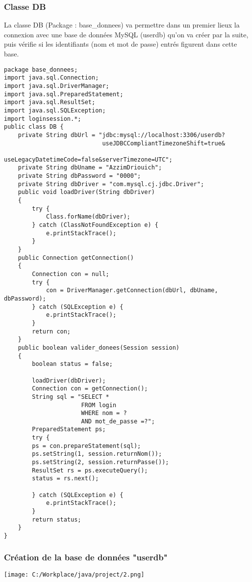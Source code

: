 \documentclass[12]{article}
\begin{document}
\newpage
\subsubsection{Classe DB}

La classe DB (Package : base\_donnees) va permettre dans un premier lieux la connexion avec une base de données MySQL (userdb) qu'on va créer par la suite, puis vérifie si les identifiants (nom et mot de passe) entrés figurent dans cette base.\\
\lstset{language=java}
\begin{lstlisting}
package base_donnees;
import java.sql.Connection;
import java.sql.DriverManager;
import java.sql.PreparedStatement;
import java.sql.ResultSet;
import java.sql.SQLException;
import loginsession.*;
public class DB {
	private String dbUrl = "jdbc:mysql://localhost:3306/userdb?
                            useJDBCCompliantTimezoneShift=true&
                            useLegacyDatetimeCode=false&serverTimezone=UTC";
	private String dbUname = "AzzimDriouich";
	private String dbPassword = "0000";
	private String dbDriver = "com.mysql.cj.jdbc.Driver";
	public void loadDriver(String dbDriver)
	{
		try {
			Class.forName(dbDriver);
		} catch (ClassNotFoundException e) {
			e.printStackTrace();
		}
	}
	public Connection getConnection()
	{
		Connection con = null;
		try {
			con = DriverManager.getConnection(dbUrl, dbUname, dbPassword);
		} catch (SQLException e) {
			e.printStackTrace();
		}
		return con;
	}
	public boolean valider_donees(Session session)
	{
		boolean status = false;

		loadDriver(dbDriver);
		Connection con = getConnection();
		String sql = "SELECT * 
					  FROM login 
					  WHERE nom = ? 
					  AND mot_de_passe =?";
		PreparedStatement ps;
		try {
		ps = con.prepareStatement(sql);
		ps.setString(1, session.returnNom());
		ps.setString(2, session.returnPasse());
		ResultSet rs = ps.executeQuery();
		status = rs.next();
		
		} catch (SQLException e) {
			e.printStackTrace();
		}
		return status;
	}
}
\end{lstlisting}


\subsubsection{Création de la base de données "userdb"}


\begin{center}
\texttt{[image: C:/Workplace/java/project/2.png]}
\end{center}
\end{document}
